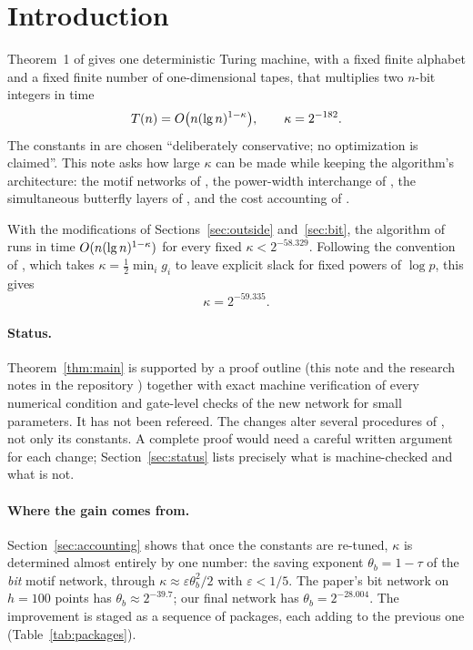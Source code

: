 \section{Introduction}\label{sec:intro}

Theorem~1 of \cite{OAI} gives one deterministic Turing machine, with a fixed finite alphabet and a fixed finite number of one-dimensional tapes, that multiplies two $n$-bit integers in time
\[
  T(n) = O\bigl(n(\lg n)^{1-\kappa}\bigr), \qquad \kappa = 2^{-182}.
\]
The constants in \cite[\S9.1]{OAI} are chosen ``deliberately conservative; no optimization is claimed''. This note asks how large $\kappa$ can be made while keeping the algorithm's architecture: the motif networks of \cite[\S3]{OAI}, the power-width interchange of \cite[Prop.~11]{OAI}, the simultaneous butterfly layers of \cite[Prop.~14]{OAI}, and the cost accounting of \cite[\S9]{OAI}.

\begin{theorem}\label{thm:main}
With the modifications of Sections~\ref{sec:outside} and~\ref{sec:bit}, the algorithm of \cite{OAI} runs in time $O(n(\lg n)^{1-\kappa})$ for every fixed $\kappa < 2^{-58.329}$. Following the convention of \cite[\S9.8]{OAI}, which takes $\kappa = \tfrac12\min_i g_i$ to leave explicit slack for fixed powers of $\log p$, this gives
\[
  \kappa = 2^{-59.335}.
\]
\end{theorem}

\paragraph{Status.} Theorem~\ref{thm:main} is supported by a proof outline (this note and the research notes in the repository \cite{repo}) together with exact machine verification of every numerical condition and gate-level checks of the new network for small parameters. It has not been refereed. The changes alter several procedures of \cite{OAI}, not only its constants. A complete proof would need a careful written argument for each change; Section~\ref{sec:status} lists precisely what is machine-checked and what is not.

\paragraph{Where the gain comes from.} Section~\ref{sec:accounting} shows that once the constants are re-tuned, $\kappa$ is determined almost entirely by one number: the saving exponent $\theta_b = 1-\tau$ of the \emph{bit} motif network, through $\kappa \approx \varepsilon\theta_b^2/2$ with $\varepsilon < 1/5$. The paper's bit network on $h = 100$ points has $\theta_b \approx 2^{-39.7}$; our final network has $\theta_b = 2^{-28.004}$. The improvement is staged as a sequence of packages, each adding to the previous one (Table~\ref{tab:packages}).

